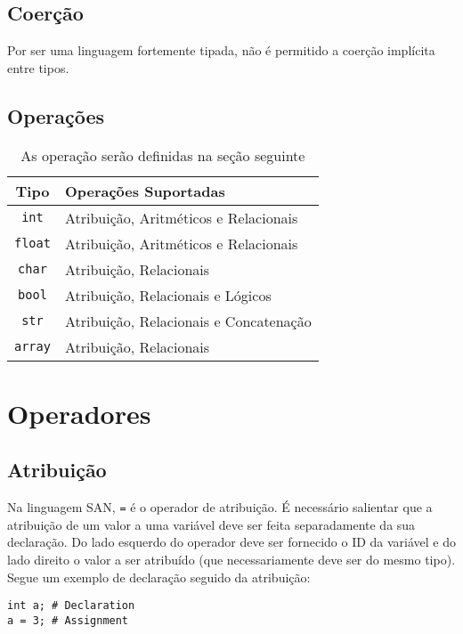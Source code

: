 \documentclass[a4paper,12pt]{article}
\begin{document}
\subsection{Coerção}
Por ser uma linguagem fortemente tipada, não é permitido a coerção implícita entre tipos.

\subsection{Operações}
\begin{table}[h!]
    \centering
    \begin{tabular}{|c|l|}
         \hline
         \textbf{Tipo} & \textbf{Operações Suportadas}\\
         \hline
         \texttt{int} & Atribuição, Aritméticos e Relacionais\\
         \hline
         \texttt{float} & Atribuição, Aritméticos e Relacionais\\
         \hline
         \texttt{char} & Atribuição, Relacionais\\
         \hline
         \texttt{bool} & Atribuição, Relacionais e Lógicos\\
         \hline
         \texttt{str} & Atribuição, Relacionais e Concatenação\\
         \hline
         \texttt{array} & Atribuição, Relacionais\\
         \hline
    \end{tabular}
    \caption{As operação serão definidas na seção seguinte}
\end{table}

\section{Operadores}
\subsection{Atribuição}
Na linguagem SAN, \texttt{=} é o operador de atribuição. É necessário salientar que a atribuição
de um valor a uma variável deve ser feita separadamente da sua declaração. Do lado esquerdo do
operador deve ser fornecido o ID da variável e do lado direito o valor a ser atribuído (que
necessariamente deve ser do mesmo tipo). Segue um exemplo de declaração seguido da atribuição:

\begin{lstlisting}
int a; # Declaration
a = 3; # Assignment
\end{lstlisting}
\end{document}
